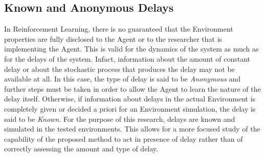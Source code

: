         \subsection{Known and Anonymous Delays}
            In Reinforcement Learning, there is no guaranteed that the Environment properties are fully disclosed to the Agent or to the researcher that is implementing the Agent. This is valid for the dynamics of the system as much as for the delays of the system. Infact, information about the amount of constant delay or about the stochastic process that produces the delay may not be available at all. In this case, the type of delay is said to be \textit{Anonymous} and further steps must be taken in order to allow the Agent to learn the nature of the delay itself. Otherwise, if information about delays in the actual Environment is completely given or decided a priori for an Environment simulation, the delay is said to be \textit{Known}. \newline
            For the purpose of this research, delays are known and simulated in the tested environments. This allows for a more focused study of the capability of the proposed method to act in presence of delay rather than of correctly assessing the amount and type of delay.
        